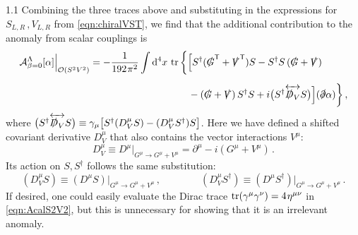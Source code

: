 \documentclass[a4paper,12pt]{article}
\def\O{{\cal O}}
\def\Acal{{\cal A}}
\def\T{\textsf{T}}
\def\Dsl{\slashed{D}}
\def\Gsl{\slashed{G}}
\def\pdsl{\slashed\partial}
\def\Vsl{\slashed{V}}
\newcommand{\s}{\hspace{0.8pt}}
\begin{document}
\begin{spacing}{1.1}
Combining the three traces above and substituting in the expressions for $S_{L,R}\,, V_{L,R}$ from \cref{eqn:chiralVST}, we find that the additional contribution to the anomaly from scalar couplings is
\begin{align}
\Acal_{\beta=0}^\Lambda[\alpha]\Bigr|_{\O(S^2V^2)} &= -\frac{1}{192\s\pi^2} \int \dd^4x\, \tr \bigg\{ \Big[
S^\dagger ( \Gsl^\T + \Vsl^\T ) S - S^\dagger S\, ( \Gsl + \Vsl )
\nonumber\\[5pt]
&\hspace{100pt}
- (\Gsl + \Vsl)\, S^\dagger S
+ i\bigl( S^\dagger \overleftrightarrow{\Dsl_V} S\bigr) \Big] (\pdsl \alpha) \bigg\} \,,
\label{eqn:AcalS2V2}
\end{align}
where $\bigl( S^\dagger \overleftrightarrow{\slashed{D}_V} S\bigr) \equiv \gamma_\mu \bigl[ S^\dagger (D_V^\mu S) - (D_V^\mu S^\dagger) S\bigr]$. Here we have defined a shifted covariant derivative $D_V^\mu$ that also contains the vector interactions $V^\mu$:
\begin{equation}
D_V^\mu \equiv D^\mu \bigr|_{G^\mu\to G^\mu+V^\mu} = \partial^\mu - i \left( G^\mu + V^\mu \right) \,.
\label{eqn:DVdef}
\end{equation}
Its action on $S, S^\dagger$ follows the same substitution:
\begin{equation}
\left(D_V^\mu S\right) \equiv \left(D^\mu S\right)\bigr|_{G^\mu\to G^\mu+V^\mu} \,, \qquad\qquad
\left(D_V^\mu S^\dagger\right) \equiv \left(D^\mu S^\dagger\right)\bigr|_{G^\mu\to G^\mu+V^\mu} \,.
\label{eq:DVS}
\end{equation}
If desired, one could easily evaluate the Dirac trace $\tr(\gamma^\mu\gamma^\nu) = 4\s\eta^{\mu\nu}$ in \cref{eqn:AcalS2V2}, but this is unnecessary for showing that it is an irrelevant anomaly.


\end{spacing}
\end{document}
